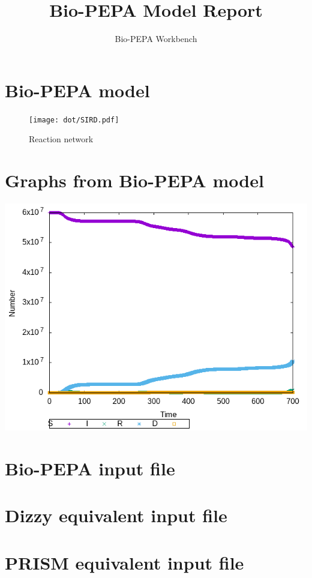 \documentclass{llncs}
\title{Bio-PEPA Model Report}
\author{Bio-PEPA Workbench}
\institute{\today}
\begin{document}
\maketitle
\section{Bio-PEPA model}

\begin{figure}[htbp]
\begin{center}
\texttt{[image: dot/SIRD.pdf]}
\caption{Reaction network}
\end{center}
\end{figure}
\newpage
\section{Graphs from Bio-PEPA model}
\includegraphics[scale=1]{png/SIRD001_stochkit_results_0}
\appendix
\newpage
\section{Bio-PEPA input file}

\newpage
\section{Dizzy equivalent input file}

\newpage
\section{PRISM equivalent input file}

\end{document}
